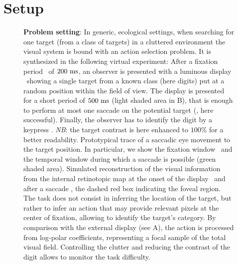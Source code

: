 

\section{Setup}
\label{sec:principles}

\begin{figure}[t!]%
	\caption{%
		{\bf Problem setting}: In generic, ecological settings, when searching for one target (from a class of targets) in a cluttered environment the visual system is bound with an action selection problem. It is synthesized in the following virtual experiment: %
		\A After a fixation period \FIX\ of $200~\si{\milli\second}$, an observer is presented with a luminous display \DIS\ showing a single target from a known class (here digits) put at a random position within the field of view. The display is presented for a short period of $500~\si{\milli\second}$ (light shaded area in B), that is enough to perform at most one saccade on the potential target (\SAC , here successful). Finally, the observer has to identify the digit by a keypress \ANS. \emph{NB}: the target contrast is here enhanced to $100\%$ for a better readability. %
		\B Prototypical trace of a saccadic eye movement to the target position. In particular, we show the fixation window \FIX\ and the temporal window during which a saccade is possible (green shaded area). %
		\C Simulated reconstruction of the visual information from the internal retinotopic map at the onset of the display \DIS\ and after a saccade \SAC , the dashed red box indicating the foveal region. The task does not consist in inferring the location of the target, but rather to infer an action that may provide relevant pixels at the center of fixation, allowing to identify the target's category. By comparison with the external display (see A), the action is processed from log-polar coefficients, representing a focal sample of the total visual field.
		Controlling the clutter and reducing the contrast of the digit allows to monitor the task difficulty.
		 }%
	\label{fig:intro} %
\end{figure}%

